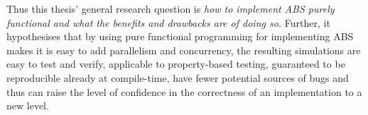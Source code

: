 Thus this thesis' general research question is \textit{how to implement ABS purely functional and what the benefits and drawbacks are of doing so.} Further, it hypothesises that by using pure functional programming for implementing ABS makes it is easy to add parallelism and concurrency, the resulting simulations are easy to test and verify, applicable to property-based testing, guaranteed to be reproducible already at compile-time, have fewer potential sources of bugs and thus can raise the level of confidence in the correctness of an implementation to a new level.

\newpage

